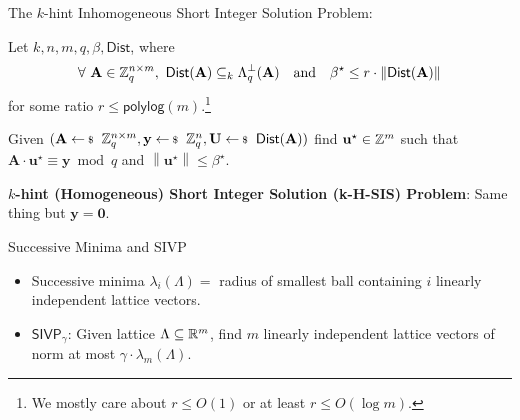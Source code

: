 \documentclass[xcolor=table,10pt,aspectratio=169]{beamer}
\renewcommand{\vec}[1]{\ensuremath{\mathbf{#1}}\xspace}
\newcommand{\norm}[1]{\left\lVert#1\right\rVert}
\providecommand{\mat}[1]{\ensuremath{\vec{#1}}\xspace}
\newcommand{\SIVP}{\ensuremath{\mathsf{SIVP}}\xspace}
\begin{document}
\begin{frame}[label={sec:orga0d8a4a}]{The \(k\)-hint Inhomogeneous Short Integer Solution Problem:}
\begin{definition}[k-H-ISIS]
Let \(k,n,m,q,\beta,\mathsf{Dist}\), where
\[\begin{aligned}
  \forall~\mat{A} \in \ZZ_q^{n \times m},~\mathsf{Dist}(\mat{A}) \subseteq_k \Lambda_q^\bot(\mat{A}) && \text{and} && \beta^{\star} \leq r \cdot \norm{\mathsf{Dist}(\mat{A})}          
  \end{aligned}
\]
for some ratio \(r \leq \mathsf{polylog}(m)\).\footnote{We mostly care about \(r \leq O(1)\) or at least \(r \leq O(\log m)\).}

Given \((\mat{A} \sample \ZZ_q^{n \times m}, \vec{y} \sample \ZZ_q^n, \mat{U} \sample \mathsf{Dist}(\mat{A}))\) find
\(\vec{u}^{\star} \in \ZZ^m\) such that \(\mat{A} \cdot\vec{u}^{\star} \equiv \vec{y} \bmod q\) and \(\norm{\vec{u}^\star} \leq \beta^{\star}\).
\label{def:khISIS}
\end{definition}

\textbf{\(k\)-hint (Homogeneous) Short Integer Solution (k-H-SIS) Problem}: Same thing but \(\vec{y} = \vec{0}\).
\end{frame}

\begin{frame}[label={sec:org4780a67}]{Successive Minima and SIVP}
\begin{itemize}
\item Successive minima \(\lambda_i(\Lambda) =\) radius of smallest ball containing \(i\) linearly independent lattice vectors.

\item \(\SIVP_\gamma\): Given lattice \(\Lambda \subseteq \mathbb{R}^m\), find \(m\) linearly independent lattice vectors of norm at most \(\gamma \cdot \lambda_m(\Lambda)\).
\end{itemize}
\end{frame}
\end{document}
